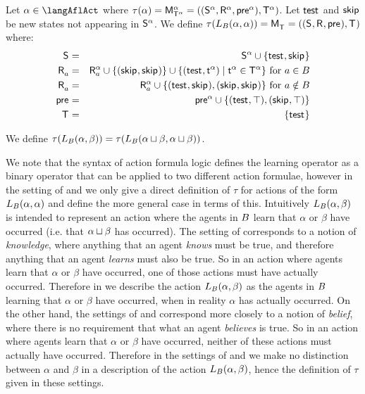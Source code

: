 \begin{definition}[Learning]\label{afl-k-learning}
    Let $\alpha \in \langAflAct$ where $\tau(\alpha) = \aPModel[\alpha]{\aStatesT[\alpha]} = \aPModelTuple[\alpha]{\aStatesT[\alpha]}$.
    Let $\aStateTest$ and $\aStateSkip$ be new states not appearing in $\aStates[\alpha]$.
    We define $\tau(\learns_\agentsB (\alpha, \alpha)) = \aPModel{\aStatesT} = \aPModelTuple{\aStatesT}$ where:
    \begin{eqnarray*}
        \aStates &=& \aStates[\alpha] \cup \{\aStateTest, \aStateSkip\}\\
        \aAccessibility{\agentA} &=& \aAccessibility[\alpha]{\agentA} \cup \{(\aStateSkip, \aStateSkip)\} \cup \{(\aStateTest, \aStateT[\alpha]) \mid \aStateT[\alpha] \in \aStatesT[\alpha]\} \text{ for } \agentA \in \agentsB\\
        \aAccessibility{\agentA} &=& \aAccessibility[\alpha]{\agentA} \cup \{(\aStateTest, \aStateSkip), (\aStateSkip, \aStateSkip)\} \text{ for } \agentA \notin \agentsB\\
        \aPrecondition &=& \aPrecondition[\alpha] \cup \{(\aStateTest, \top), (\aStateSkip, \top)\}\\
        \aStatesT &=& \{\aStateTest\}
    \end{eqnarray*}

    We define $\tau(\learns_\agentsB (\alpha, \beta)) = \tau(\learns_\agentsB (\alpha \choice \beta, \alpha \choice \beta))$.
\end{definition}

We note that the syntax of action formula logic defines the learning operator as a binary operator that can be applied to two different action formulae, however in the setting of \classK{} and \classKFF{} we only give a direct definition of $\tau$ for actions of the form $\learns_\agentsB (\alpha, \alpha)$ and define the more general case in terms of this.
Intuitively $\learns_\agentsB (\alpha, \beta)$ is intended to represent an action where the agents in $\agentsB$ learn that $\alpha$ or $\beta$ have occurred (i.e. that $\alpha \choice \beta$ has occurred).
The setting of \classS{} corresponds to a notion of {\em knowledge}, where anything that an agent {\em knows} must be true, and therefore anything that an agent {\em learns} must also be true.
So in an action where agents learn that $\alpha$ or $\beta$ have occurred, one of those actions must have actually occurred.
Therefore in \classS{} we describe the action $\learns_\agentsB (\alpha, \beta)$ as the agents in $\agentsB$ learning that $\alpha$ or $\beta$ have occurred, when in reality $\alpha$ has actually occurred.
On the other hand, the settings of \classK{} and \classKFF{} correspond more closely to a notion of {\em belief}, where there is no requirement that what an agent {\em believes} is true.
So in an action where agents learn that $\alpha$ or $\beta$ have occurred, neither of these actions must actually have occurred.
Therefore in the settings of \classK{} and \classKFF{} we make no distinction between $\alpha$ and $\beta$ in a description of the action $\learns_\agentsB (\alpha, \beta)$, hence the definition of $\tau$ given in these settings.

